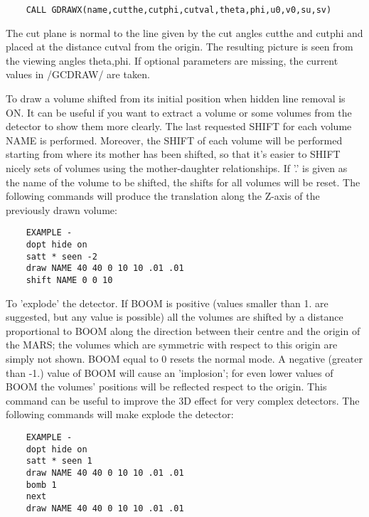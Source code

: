 \begin{verbatim}
    CALL GDRAWX(name,cutthe,cutphi,cutval,theta,phi,u0,v0,su,sv)
\end{verbatim}
   \par
The cut plane is normal to the line given by the cut angles cutthe and 
   cutphi and placed at the distance cutval from the origin.  The resulting 
   picture is seen from the viewing angles theta,phi.  If optional parameters 
   are missing, the current values in /GCDRAW/ are taken.  

\ENDCMD


\BEGARG
{}
\ENDARG

   \par
To draw a volume shifted from its initial position when hidden line removal 
   is ON. It can be useful if you want to extract a volume or some volumes 
   from the detector to show them more clearly.  The last requested SHIFT for 
   each volume NAME is performed. Moreover, the SHIFT of each volume will be 
   performed starting from where its mother has been shifted, so that it's 
   easier to SHIFT nicely sets of volumes using the mother-daughter 
   relationships.  If '.' is given as the name of the volume to be shifted, 
   the shifts for all volumes will be reset.  The following commands will 
   produce the translation along the Z-axis of the previously drawn volume:  
\begin{verbatim}
    EXAMPLE -
    dopt hide on
    satt * seen -2
    draw NAME 40 40 0 10 10 .01 .01
    shift NAME 0 0 10
\end{verbatim}

\ENDCMD


\BEGARG
{}
\ENDARG

   \par
To 'explode' the detector. If BOOM is positive (values smaller than 1. are 
   suggested, but any value is possible) all the volumes are shifted by a 
   distance proportional to BOOM along the direction between their centre and 
   the origin of the MARS; the volumes which are symmetric with respect to 
   this origin are simply not shown.  BOOM equal to 0 resets the normal mode.  
   A negative (greater than -1.) value of BOOM will cause an 'implosion'; for 
   even lower values of BOOM the volumes' positions will be reflected respect 
   to the origin.  This command can be useful to improve the 3D effect for 
   very complex detectors. The following commands will make explode the 
   detector:  
\begin{verbatim}
    EXAMPLE -
    dopt hide on
    satt * seen 1
    draw NAME 40 40 0 10 10 .01 .01
    bomb 1
    next
    draw NAME 40 40 0 10 10 .01 .01
\end{verbatim}

